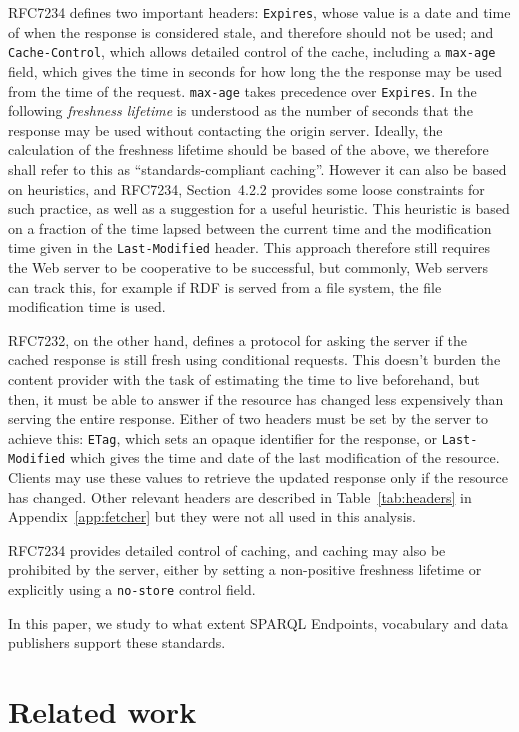 \documentclass{llncs}
\newcommand{\httph}[1]{\texttt{#1}}
\begin{document}
RFC7234 defines two important headers: \httph{Expires}, whose value is
a date and time of when the response is considered stale, and
therefore should not be used; and \httph{Cache-Control}, which allows
detailed control of the cache, including a \httph{max-age} field,
which gives the time in seconds for how long the the response may be
used from the time of the request. \httph{max-age} takes precedence
over \httph{Expires}. In the following \emph{freshness lifetime} is
understood as the number of seconds that the response may be used
without contacting the origin server. Ideally, the calculation of the
freshness lifetime should be based of the above, we therefore shall
refer to this as ``standards-compliant caching''. However it can also
be based on heuristics, and RFC7234, Section~4.2.2 provides some loose
constraints for such practice, as well as a suggestion for a useful
heuristic. This heuristic is based on a fraction of the time lapsed
between the current time and the modification time given in the
\httph{Last-Modified} header. This approach therefore still requires
the Web server to be cooperative to be successful, but commonly, Web
servers can track this, for example if RDF is served from a file
system, the file modification time is used.

RFC7232, on the other hand, defines a protocol for asking the server
if the cached response is still fresh using conditional requests. This
doesn't burden the content provider with the task of estimating the
time to live beforehand, but then, it must be able to answer if the
resource has changed less expensively than serving the entire
response. Either of two headers must be set by the server to achieve
this: \httph{ETag}, which sets an opaque identifier for the response,
or \httph{Last-Modified} which gives the time and date of the last
modification of the resource. Clients may use these values to retrieve
the updated response only if the resource has changed. Other relevant
headers are described in Table~\ref{tab:headers}
in Appendix~\ref{app:fetcher} but they were not all used in this
analysis.

RFC7234 provides detailed control of caching, and caching may also be
prohibited by the server, either by setting a non-positive freshness
lifetime or explicitly using a \httph{no-store} control field.

In this paper, we study to what extent SPARQL Endpoints, vocabulary
and data publishers support these standards.

\section{Related work}
\end{document}
